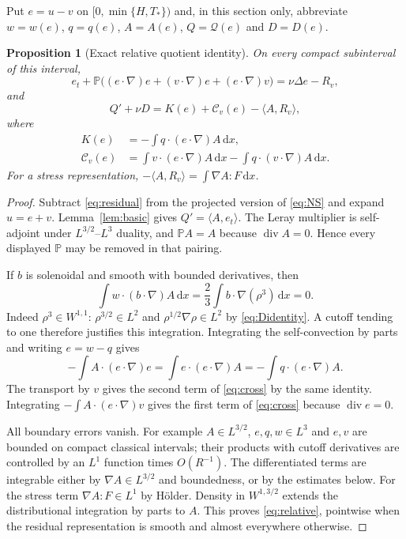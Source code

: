 \documentclass[11pt,a4paper]{article}
\newtheorem{proposition}[theorem]{Proposition}
\theoremstyle{definition}\newtheorem{definition}[theorem]{Definition}
\theoremstyle{remark}\newtheorem{remark}[theorem]{Remark}
\newcommand{\Q}{\mathcal Q}
\newcommand{\PP}{\mathbb P}
\newcommand{\dd}{\,\mathrm d}
\newcommand{\ip}[2]{\langle #1,#2\rangle}
\newcommand{\diver}{\operatorname{div}}
\numberwithin{equation}{section}
\begin{document}
Put $e=u-v$ on $[0,\min\{H,T_*\})$ and, in this section only, abbreviate $w=w(e)$, $q=q(e)$, $A=A(e)$, $Q=\Q(e)$ and $D=D(e)$.
\begin{proposition}[Exact relative quotient identity]\label{prop:identity}
On every compact subinterval of this interval,
\begin{equation}\label{eq:errorPDE}
 e_t+\PP\bigl((e\cdot\nabla)e+(v\cdot\nabla)e+(e\cdot\nabla)v\bigr)
 =\nu\Delta e-R_v,
\end{equation}
and
\begin{equation}\label{eq:relative}
 Q'+\nu D=K(e)+\mathcal C_v(e)-\ip A{R_v},
\end{equation}
where
\begin{align}
 K(e)&=-\int q\cdot(e\cdot\nabla)A\dd x,\label{eq:Kerror}\\
 \mathcal C_v(e)&=\int v\cdot(e\cdot\nabla)A\dd x
                 -\int q\cdot(v\cdot\nabla)A\dd x.\label{eq:cross}
\end{align}
For a stress representation, $-\ip A{R_v}=\int\nabla A:F\dd x$.
\end{proposition}
\begin{proof}
Subtract \eqref{eq:residual} from the projected version of \eqref{eq:NS} and expand $u=e+v$. Lemma~\ref{lem:basic} gives $Q'=\ip A{e_t}$. The Leray multiplier is self-adjoint under $L^{3/2}$--$L^3$ duality, and $\PP A=A$ because $\diver A=0$. Hence every displayed $\PP$ may be removed in that pairing.

If $b$ is solenoidal and smooth with bounded derivatives, then
\begin{equation}\label{eq:zerotransport}
 \int w\cdot(b\cdot\nabla)A\dd x
 =\frac23\int b\cdot\nabla(\rho^3)\dd x=0.
\end{equation}
Indeed $\rho^3\in W^{1,1}$: $\rho^{3/2}\in L^2$ and $\rho^{1/2}\nabla\rho\in L^2$ by \eqref{eq:Didentity}. A cutoff tending to one therefore justifies this integration. Integrating the self-convection by parts and writing $e=w-q$ gives
\[
 -\int A\cdot(e\cdot\nabla)e
 =\int e\cdot(e\cdot\nabla)A
 =-\int q\cdot(e\cdot\nabla)A.
\]
The transport by $v$ gives the second term of \eqref{eq:cross} by the same identity. Integrating $-\int A\cdot(e\cdot\nabla)v$ gives the first term of \eqref{eq:cross} because $\diver e=0$.

All boundary errors vanish. For example $A\in L^{3/2}$, $e,q,w\in L^3$ and $e,v$ are bounded on compact classical intervals; their products with cutoff derivatives are controlled by an $L^1$ function times $O(R^{-1})$. The differentiated terms are integrable either by $\nabla A\in L^{3/2}$ and boundedness, or by the estimates below. For the stress term $\nabla A:F\in L^1$ by H\"older. Density in $W^{1,3/2}$ extends the distributional integration by parts to $A$. This proves \eqref{eq:relative}, pointwise when the residual representation is smooth and almost everywhere otherwise.
\end{proof}
\end{document}
